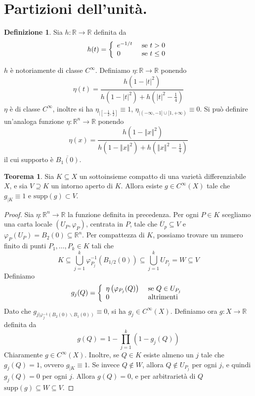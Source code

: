 \documentclass[a4paper,11pt]{article}
\theoremstyle{definition}
\newtheorem{definizione}{Definizione}[section]
\theoremstyle{theorem}
\newtheorem{teorema}{Teorema}[section]
\newcommand{\norm}[1]{\left\Vert#1\right\Vert}
\begin{document}
\section{Partizioni dell'unità.}
\begin{definizione}
	Sia $h\colon\mathbb{R}\to\mathbb{R}$ definita da
	\[h(t)=\left\{\begin{array}{l l}
	e^{-1/t}&\textrm{ se $t>0$}\\
	0 &\textrm{ se $t\leq0$}
	\end{array}\right.\]
\end{definizione}
$h$ è notoriamente di classe $C^\infty$. Definiamo $\eta\colon\mathbb{R}\to\mathbb{R}$ ponendo
\[\eta(t)=\frac{h\left(1-|t|^2\right)}{h\left(1-|t|^2\right)+h\left(|t|^2-\frac{1}{4}\right)}\]
$\eta$ è di classe $C^\infty$, inoltre si ha $\eta_{|\left[-\frac{1}{2},\frac{1}{2}\right]}\equiv1$, $\eta_{|(-\infty,-1]\cup[1,+\infty)}\equiv0$.
Si può definire un'analoga funzione $\eta\colon\mathbb{R}^n\to\mathbb{R}$ ponendo
\[\eta(x)=\frac{h\left(1-\norm{x}^2\right)}{h\left(1-\norm{x}^2\right)+h\left(\norm{x}^2-\frac{1}{4}\right)}\]
il cui supporto è $\overline{B_1(0)}$.
\begin{teorema}
	Sia $K\subseteq X$ un sottoinsieme compatto di una varietà differenziabile $X$, e sia $V\supseteq K$ un intorno aperto di $K$. Allora esiste $g\in C^\infty(X)$ tale che $g_{|K}\equiv1$ e $\textrm{supp}(g)\subset V$.
	\label{supporto}
\end{teorema}
\begin{proof}
	Sia $\eta\colon\mathbb{R}^n\to\mathbb{R}$ la funzione definita in precedenza. Per ogni $P\in K$ scegliamo una carta locale $(U_P,\varphi_P)$, centrata in $P$, tale che $\overline{U}_p\subseteq V$ e $\varphi_P(U_P)=B_2(0)\subseteq\mathbb{R}^n$. Per compattezza di $K$, possiamo trovare un numero finito di punti $P_1,\dots,P_k\in K$ tali che
	\[K\subseteq\bigcup_{j=1}^{k}\varphi^{-1}_{P_j}\left(B_{1/2}(0)\right)\subseteq\bigcup_{j=1}^{k}U_{P_j}=W\subseteq V\]
	Definiamo
	\[g_j(Q)=\left\{\begin{array}{l l}
	\eta\left(\varphi_{P_j}(Q)\right)&\textrm{ se $Q\in U_{P_j}$}\\
	0 & \textrm{ altrimenti}
	\end{array}\right.\]
	Dato che $g_{j|\varphi_j^{-1}\left(B_2(0)\backslash B_1(0)\right)}\equiv0$, si ha $g_j\in C^\infty(X)$.
	Definiamo ora $g\colon X\to\mathbb{R}$ definita da
	\[g(Q)=1-\prod_{j=1}^{k}\left(1-g_j(Q)\right)\]
	Chiaramente $g\in C^\infty(X)$. Inoltre, se $Q\in K$ esiste almeno un $j$ tale che $g_j(Q)=1$, ovvero $g_{|K}\equiv1$. Se invece $Q\not\in W$, allora $Q\not\in U_{P_j}$ per ogni $j$, e quindi $g_j(Q)=0$ per ogni $j$. Allora $g(Q)=0$, e per arbitrarietà di $Q$ $\textrm{supp}(g)\subseteq W\subseteq V$.
\end{proof}
\end{document}
